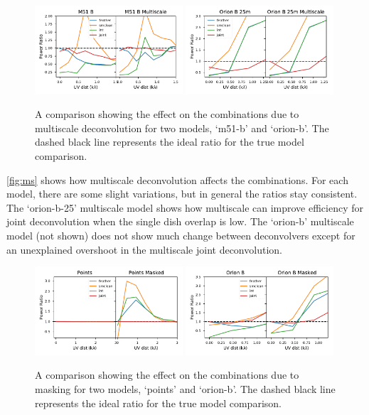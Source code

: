 \documentclass[preprint]{aastex63}
\begin{document}
\begin{figure}[ht]
    \includegraphics[width=0.49\textwidth]{figures/M51-B-Multiscale}
    \includegraphics[width=0.49\textwidth]{figures/Orion-B-25m-Multiscale}
    \caption{A comparison showing the effect on the combinations due to multiscale deconvolution for two models, `m51-b' and `orion-b'. The dashed black line represents the ideal ratio for the true model comparison. }
    \label{fig:ms}
\end{figure}

\autoref{fig:ms} shows how multiscale deconvolution affects the combinations. For each model, there are some slight variations, but in general the ratios stay consistent. The `orion-b-25' multiscale model shows how multiscale can improve efficiency for joint deconvolution when the single dish overlap is low. The `orion-b' multiscale model (not shown) does not show much change between deconvolvers except for an unexplained overshoot in the multiscale joint deconvolution.

\begin{figure}[ht]
    \includegraphics[width=0.49\textwidth]{figures/Points-Masked}
    \includegraphics[width=0.49\textwidth]{figures/Orion-B-Masked}
    \caption{A comparison showing the effect on the combinations due to masking for two models, `points' and `orion-b'. The dashed black line represents the ideal ratio for the true model comparison. }
    \label{fig:masked}
\end{figure}
\end{document}
